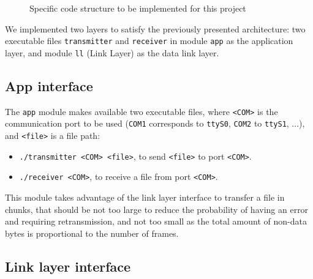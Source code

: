 \documentclass[a4paper, 11pt]{report}
\begin{document}
\begin{figure}[H]
	\caption{Specific code structure to be implemented for this project}
\end{figure}

We implemented two layers to satisfy the previously presented architecture: two executable files \texttt{transmitter} and \texttt{receiver} in module \texttt{app} as the application layer, and module \texttt{ll} (Link Layer) as the data link layer.

\subsection{App interface}

The \texttt{app} module makes available two executable files, where \texttt{<COM>} is the communication port to be used (\texttt{COM1} corresponds to \texttt{ttyS0}, \texttt{COM2} to \texttt{ttyS1}, ...), and \texttt{<file>} is a file path:
\begin{itemize}
	\itemsep0em
	\item \texttt{./transmitter <COM> <file>}, to send \texttt{<file>} to port \texttt{<COM>}.
	\item \texttt{./receiver <COM>}, to receive a file from port \texttt{<COM>}.
\end{itemize}

This module takes advantage of the link layer interface to transfer a file in chunks, that should be not too large to reduce the probability of having an error and requiring retransmission, and not too small as the total amount of non-data bytes is proportional to the number of frames.


\subsection{Link layer interface}
\end{document}
